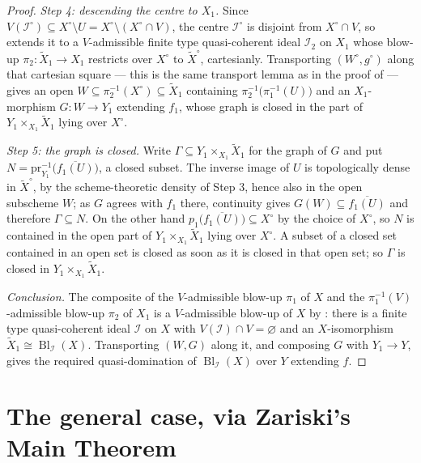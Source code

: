 \begin{proof}
  \emph{Step 4: descending the centre to $X_1$.}  Since
  $V(\mathcal I^{\circ})\subseteq X^{\circ}\setminus U=
  X^{\circ}\setminus(X^{\circ}\cap V)$, the centre $\mathcal I^{\circ}$ is
  disjoint from $X^{\circ}\cap V$, so
   extends it to a $V$-admissible
  finite type quasi-coherent ideal $\mathcal I_2$ on $X_1$ whose blow-up
  $\pi_2\colon\widetilde X_1\to X_1$ restricts over $X^{\circ}$ to
  $\widetilde X^{\circ}$, cartesianly.  Transporting $(W^{\circ},g^{\circ})$
  along that cartesian square — this is the same transport lemma as in the
  proof of  — gives an open
  $W\subseteq\pi_2^{-1}(X^{\circ})\subseteq\widetilde X_1$ containing
  $\pi_2^{-1}\bigl(\pi_1^{-1}(U)\bigr)$ and an $X_1$-morphism $G\colon W\to
  Y_1$ extending $f_1$, whose graph is closed in the part of
  $Y_1\times_{X_1}\widetilde X_1$ lying over $X^{\circ}$.

  \emph{Step 5: the graph is closed.}  Write $\Gamma\subseteq
  Y_1\times_{X_1}\widetilde X_1$ for the graph of $G$ and put
  $N=\mathrm{pr}_{Y_1}^{-1}\bigl(\overline{f_1(U)}\bigr)$, a closed subset.
  The inverse image of $U$ is topologically dense in $\widetilde X^{\circ}$,
  by the scheme-theoretic density of Step 3, hence also in the open subscheme
  $W$; as $G$ agrees with $f_1$ there, continuity gives
  $G(W)\subseteq\overline{f_1(U)}$ and therefore $\Gamma\subseteq N$.  On the
  other hand $p_1\bigl(\overline{f_1(U)}\bigr)\subseteq X^{\circ}$ by the
  choice of $X^{\circ}$, so $N$ is contained in the open part of
  $Y_1\times_{X_1}\widetilde X_1$ lying over $X^{\circ}$.  A subset of a closed
  set contained in an open set is closed as soon as it is closed in that open
  set; so $\Gamma$ is closed in $Y_1\times_{X_1}\widetilde X_1$.

  \emph{Conclusion.}  The composite of the $V$-admissible blow-up
  $\pi_1$ of $X$ and the $\pi_1^{-1}(V)$-admissible blow-up $\pi_2$ of $X_1$ is
  a $V$-admissible blow-up of $X$ by
  : there is a finite type
  quasi-coherent ideal $\mathcal I$ on $X$ with
  $V(\mathcal I)\cap V=\varnothing$ and an $X$-isomorphism
  $\widetilde X_1\cong\operatorname{Bl}_{\mathcal I}(X)$.  Transporting $(W,G)$
  along it, and composing $G$ with $Y_1\to Y$, gives the required
  quasi-domination of $\operatorname{Bl}_{\mathcal I}(X)$ over $Y$ extending
  $f$.
\end{proof}

\section{The general case, via Zariski's Main Theorem}


